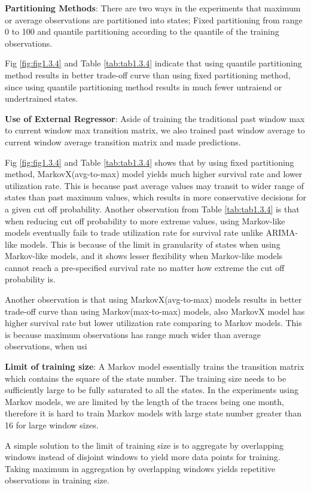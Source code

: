 \documentclass{article}
\begin{document}
\begin{flushleft}
\textbf{Partitioning Methods}: There are two ways in the experiments that maximum or average observations are partitioned into states; Fixed partitioning from range 0 to 100 and quantile partitioning according to the quantile of the training observations. 

Fig \ref{fig:fig1.3.4} and Table \ref{tab:tab1.3.4} indicate that using quantile partitioning method results in better trade-off curve than using fixed partitioning method, since using quantile partitioning method results in much fewer untraiend or undertrained states.
\end{flushleft}

\begin{flushleft}
\textbf{Use of External Regressor}: Aside of training the traditional past window max to current window max transition matrix, we also trained past window average to current window average transition matrix and made predictions. 

Fig \ref{fig:fig1.3.4} and Table \ref{tab:tab1.3.4} shows that by using fixed partitioning method, MarkovX(avg-to-max) model yields much higher survival rate and lower utilization rate. This is because past average values may transit to wider range of states than past maximum values, which results in more conservative decisions for a given cut off probability. Another observation from Table \ref{tab:tab1.3.4} is that when reducing cut off probability to more extreme values, using Markov-like models eventually fails to trade utilization rate for survival rate unlike ARIMA-like models. This is because of the limit in granularity of states when using Markov-like models, and it shows lesser flexibility when Markov-like models cannot reach a pre-specified survival rate no matter how extreme the cut off probability is. 

Another observation is that using MarkovX(avg-to-max) models results in better trade-off curve than using Markov(max-to-max) models, also MarkovX model has higher survival rate but lower utilization rate comparing to Markov models. This is because maximum observations has range much wider than average observations, when usi 
\end{flushleft}

\begin{flushleft}
\textbf{Limit of training size}: A Markov model essentially trains the transition matrix which contains the square of the state number. The training size needs to be sufficiently large to be fully saturated to all the states. In the experiments using Markov models, we are limited by the length of the traces being one month, therefore it is hard to train Markov models with large state number greater than 16 for large window sizes.

A simple solution to the limit of training size is to aggregate by overlapping windows instead of disjoint windows to yield more data points for training. Taking maximum in aggregation by overlapping windows yields repetitive observations in training size.
\end{flushleft}
\end{document}
